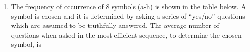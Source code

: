 \begin{enumerate}
\item The frequency of occurrence of 8 symbols (a-h) is shown in the table below. A
symbol is chosen and it is determined by asking a series of “yes/no” questions which
are assumed to be truthfully answered. The average number of questions when asked
in the most efficient sequence, to determine the chosen symbol, is \\
\begin{table}[h]
	
\end{table} \\
\solution

\end{enumerate}

